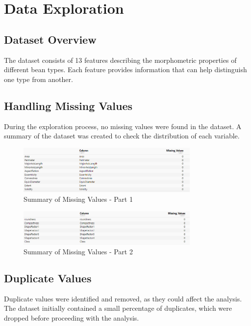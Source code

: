 \documentclass[a4paper,12pt]{article}
\begin{document}
\newpage

\section{Data Exploration}
\subsection{Dataset Overview}
The dataset consists of 13 features describing the morphometric properties of different bean types. Each feature provides information that can help distinguish one type from another.

\subsection{Handling Missing Values}
During the exploration process, no missing values were found in the dataset. A summary of the dataset was created to check the distribution of each variable.

\begin{figure}[H]
    \centering
    \includegraphics[width=0.8\textwidth]{graphs/missing1.png}
    \caption{Summary of Missing Values - Part 1}
    \label{fig:missing_values_1}
\end{figure}

\begin{figure}[H]
    \centering
    \includegraphics[width=0.8\textwidth]{graphs/missing2.png}
    \caption{Summary of Missing Values - Part 2}
    \label{fig:missing_values_2}
\end{figure}

\subsection{Duplicate Values}
Duplicate values were identified and removed, as they could affect the analysis. The dataset initially contained a small percentage of duplicates, which were dropped before proceeding with the analysis.
\end{document}
